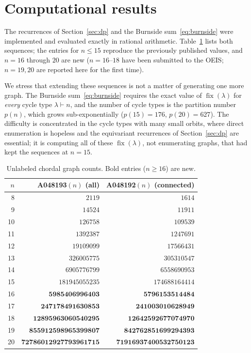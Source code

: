 \documentclass[11pt]{article}
\theoremstyle{plain}
\theoremstyle{definition}
\DeclareMathOperator{\fix}{fix}
\begin{document}
\section{Computational results}\label{sec:results}

The recurrences of Section~\ref{sec:dp} and the Burnside sum~\eqref{eq:burnside} were implemented and
evaluated exactly in rational arithmetic. Table~\ref{tab:vals} lists both sequences; the entries for
$n\le15$ reproduce the previously published values, and $n=16$ through $20$ are new ($n=16$--$18$ have
been submitted to the OEIS; $n=19,20$ are reported here for the first time).

We stress that extending these sequences is not a matter of generating one more graph. The Burnside
sum~\eqref{eq:burnside} requires the exact value of $\fix(\lambda)$ for \emph{every} cycle type
$\lambda\vdash n$, and the number of cycle types is the partition number $p(n)$, which grows
sub-exponentially ($p(15)=176$, $p(20)=627$). The difficulty is concentrated in the cycle types with
many small orbits, where direct enumeration is hopeless and the equivariant recurrences of
Section~\ref{sec:dp} are essential; it is computing all of these $\fix(\lambda)$, not enumerating
graphs, that had kept the sequences at $n=15$.

\begin{table}[h]
\centering\small
\begin{tabular}{rrr}
\toprule
$n$ & A048193$(n)$ (all) & A048192$(n)$ (connected)\\
\midrule
8  & $2119$ & $1614$\\
9  & $14524$ & $11911$\\
10 & $126758$ & $109539$\\
11 & $1392387$ & $1247691$\\
12 & $19109099$ & $17566431$\\
13 & $326005775$ & $305310547$\\
14 & $6905776799$ & $6558690953$\\
15 & $181945055235$ & $174688164414$\\
\midrule
16 & $\mathbf{5985406996403}$ & $\mathbf{5796153514484}$\\
17 & $\mathbf{247178491630853}$ & $\mathbf{241003010628949}$\\
18 & $\mathbf{12895963060540295}$ & $\mathbf{12642592677074970}$\\
19 & $\mathbf{855912598965399807}$ & $\mathbf{842762851699294393}$\\
20 & $\mathbf{72786012927793961715}$ & $\mathbf{71916937400532750123}$\\
\bottomrule
\end{tabular}
\caption{Unlabeled chordal graph counts. Bold entries ($n\ge16$) are new.}
\label{tab:vals}
\end{table}
\end{document}
